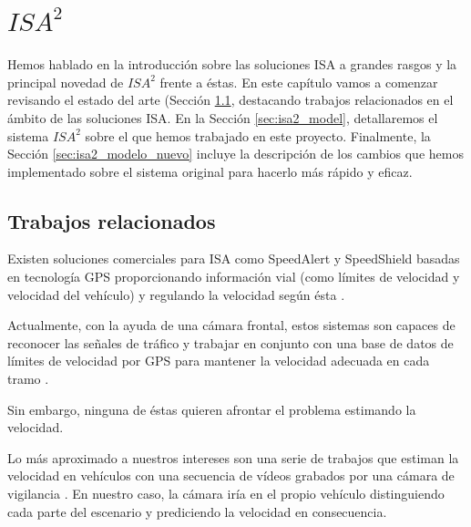\chapter{$ISA^{2}$}
\label{ch:isa2}

Hemos hablado en la introducción sobre las soluciones \ac{ISA} a grandes rasgos y la principal novedad de $ISA^{2}$ frente a éstas. En este capítulo vamos a comenzar revisando el estado del arte (Sección \ref{sec:isa2_estado_del_arte}, destacando trabajos relacionados en el ámbito de las soluciones \ac{ISA}. En la Sección \ref{sec:isa2_model}, detallaremos el sistema $ISA^{2}$ sobre el que hemos trabajado en este proyecto. Finalmente, la Sección \ref{sec:isa2_modelo_nuevo} incluye la descripción de los cambios que hemos implementado sobre el sistema original para hacerlo más rápido y eficaz.


\section{Trabajos relacionados}
\label{sec:isa2_estado_del_arte}

Existen soluciones comerciales para \ac{ISA} como SpeedAlert \cite{soluciones_comerciales} y SpeedShield basadas en tecnología GPS proporcionando información vial (como límites de velocidad y velocidad del vehículo) y regulando la velocidad según ésta \cite{speedshield}.

Actualmente, con la ayuda de una cámara frontal, estos sistemas son capaces de reconocer las señales de tráfico y trabajar en conjunto con una base de datos de límites de velocidad por GPS para mantener la velocidad adecuada en cada tramo \cite{sol_img}.

Sin embargo, ninguna de éstas quieren afrontar el problema estimando la velocidad.

Lo más aproximado a nuestros intereses son una serie de trabajos que estiman la velocidad en vehículos con una secuencia de vídeos grabados por una cámara de vigilancia \cite{isa2} \cite{shukla}. En nuestro caso, la cámara iría en el propio vehículo distinguiendo cada parte del escenario y prediciendo la velocidad en consecuencia.


